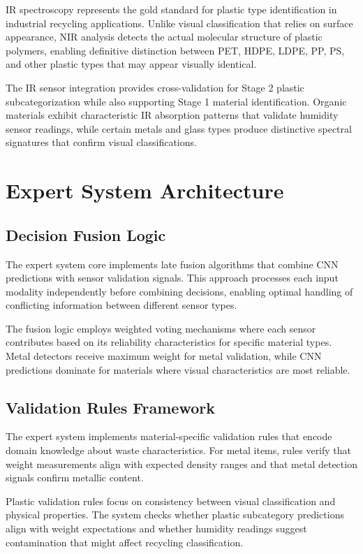 \documentclass[11pt, a4paper]{article}
\begin{document}
IR spectroscopy represents the gold standard for plastic type identification in industrial recycling applications. Unlike visual classification that relies on surface appearance, NIR analysis detects the actual molecular structure of plastic polymers, enabling definitive distinction between PET, HDPE, LDPE, PP, PS, and other plastic types that may appear visually identical.

The IR sensor integration provides cross-validation for Stage 2 plastic subcategorization while also supporting Stage 1 material identification. Organic materials exhibit characteristic IR absorption patterns that validate humidity sensor readings, while certain metals and glass types produce distinctive spectral signatures that confirm visual classifications.

\section{Expert System Architecture}

\subsection{Decision Fusion Logic}
The expert system core implements late fusion algorithms that combine CNN predictions with sensor validation signals. This approach processes each input modality independently before combining decisions, enabling optimal handling of conflicting information between different sensor types.

The fusion logic employs weighted voting mechanisms where each sensor contributes based on its reliability characteristics for specific material types. Metal detectors receive maximum weight for metal validation, while CNN predictions dominate for materials where visual characteristics are most reliable.

\subsection{Validation Rules Framework}
The expert system implements material-specific validation rules that encode domain knowledge about waste characteristics. For metal items, rules verify that weight measurements align with expected density ranges and that metal detection signals confirm metallic content.

Plastic validation rules focus on consistency between visual classification and physical properties. The system checks whether plastic subcategory predictions align with weight expectations and whether humidity readings suggest contamination that might affect recycling classification.
\end{document}
